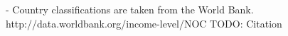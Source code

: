 - Country classifications are taken from the World
Bank. http://data.worldbank.org/income-level/NOC
TODO: Citation


